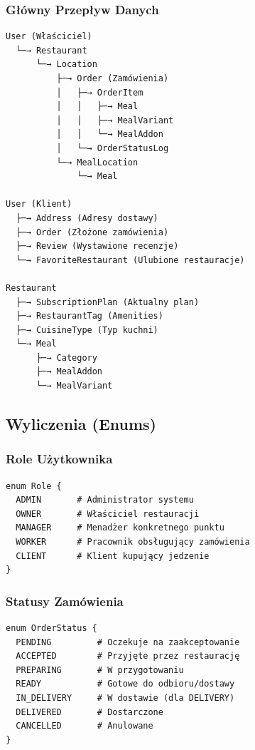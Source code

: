 \documentclass[12pt,a4paper,utf-8]{article}
\begin{document}
\subsubsection{Główny Przepływ Danych}

\begin{verbatim}
User (Właściciel)
  └─→ Restaurant
      └─→ Location
          ├─→ Order (Zamówienia)
          │   ├─→ OrderItem
          │   │   ├─→ Meal
          │   │   ├─→ MealVariant
          │   │   └─→ MealAddon
          │   └─→ OrderStatusLog
          └─→ MealLocation
              └─→ Meal

User (Klient)
  ├─→ Address (Adresy dostawy)
  ├─→ Order (Złożone zamówienia)
  ├─→ Review (Wystawione recenzje)
  └─→ FavoriteRestaurant (Ulubione restauracje)

Restaurant
  ├─→ SubscriptionPlan (Aktualny plan)
  ├─→ RestaurantTag (Amenities)
  ├─→ CuisineType (Typ kuchni)
  └─→ Meal
      ├─→ Category
      ├─→ MealAddon
      └─→ MealVariant
\end{verbatim}

\subsection{Wyliczenia (Enums)}

\subsubsection{Role Użytkownika}

\begin{verbatim}
enum Role {
  ADMIN       # Administrator systemu
  OWNER       # Właściciel restauracji
  MANAGER     # Menadżer konkretnego punktu
  WORKER      # Pracownik obsługujący zamówienia
  CLIENT      # Klient kupujący jedzenie
}
\end{verbatim}

\subsubsection{Statusy Zamówienia}

\begin{verbatim}
enum OrderStatus {
  PENDING         # Oczekuje na zaakceptowanie
  ACCEPTED        # Przyjęte przez restaurację
  PREPARING       # W przygotowaniu
  READY           # Gotowe do odbioru/dostawy
  IN_DELIVERY     # W dostawie (dla DELIVERY)
  DELIVERED       # Dostarczone
  CANCELLED       # Anulowane
}
\end{verbatim}
\end{document}

